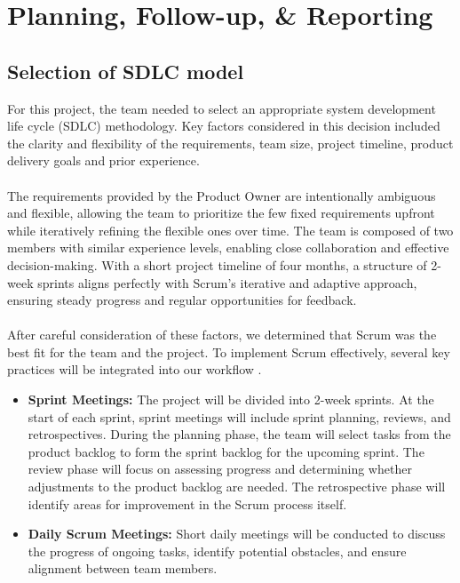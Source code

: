 \section{Planning, Follow-up, \& Reporting}
\subsection{Selection of SDLC model}

\begin{comment}
    Describe how the group will follow the chosen model
    
    Fire viktige forhold å ta hensyn til ved valg av utviklingmodell /
    prosessrammeverk :
    ▪ Universitetets krav til prosjektarbeidet/bacheloroppgaven
    ▪ Karakteristika ved oppgaven
    ▪ Motivasjonen og ferdighetene til deltagerne
    ▪ Ønsker og krav fra oppdragsgiver
    Velg modell – deretter bør dere tilpasse den / sette den opp til deres
    “setting”.

\end{comment}

For this project, the team needed to select an appropriate system development life cycle (SDLC) methodology. Key factors considered in this decision included the clarity and flexibility of the requirements, team size, project timeline, product delivery goals and prior experience. 
\\ \\
The requirements provided by the Product Owner are intentionally ambiguous and flexible, allowing the team to prioritize the few fixed requirements upfront while iteratively refining the flexible ones over time. The team is composed of two members with similar experience levels, enabling close collaboration and effective decision-making. With a short project timeline of four months, a structure of 2-week sprints aligns perfectly with Scrum's iterative and adaptive approach, ensuring steady progress and regular opportunities for feedback. 
\\ \\
After careful consideration of these factors, we determined that Scrum was the best fit for the team and the project. To implement Scrum effectively, several key practices will be integrated into our workflow \cite{scrum_guide}.
\begin{itemize}
    \item \textbf{Sprint Meetings:} The project will be divided into 2-week sprints. At the start of each sprint, sprint meetings will include sprint planning, reviews, and retrospectives. During the planning phase, the team will select tasks from the product backlog to form the sprint backlog for the upcoming sprint. The review phase will focus on assessing progress and determining whether adjustments to the product backlog are needed. The retrospective phase will identify areas for improvement in the Scrum process itself.
    \item \textbf{Daily Scrum Meetings:} Short daily meetings will be conducted to discuss the progress of ongoing tasks, identify potential obstacles, and ensure alignment between team members.
\end{itemize}

